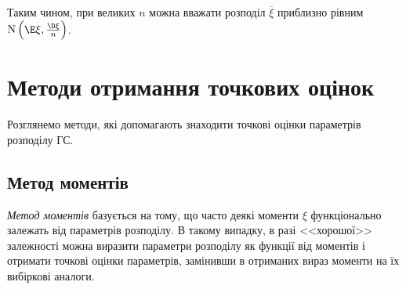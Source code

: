 Таким чином, при великих $n$ можна вважати розподіл $\overline{\xi}$ приблизно рівним $ \mathrm{N} \left(\E\xi, \frac{\D\xi}{n}\right)$.

\section{Методи отримання точкових оцінок}
Розглянемо  методи, які допомагають знаходити точкові оцінки параметрів розподілу ГС.
\subsection{Метод моментів}
\emph{Метод моментів} базується на тому, що часто деякі моменти $\xi$ функціонально залежать від параметрів розподілу.
В такому випадку, в разі <<хорошої>> залежності можна виразити параметри розподілу як функції від моментів і отримати точкові оцінки параметрів,
замінивши в отриманих вираз моменти на їх вибіркові аналоги.
